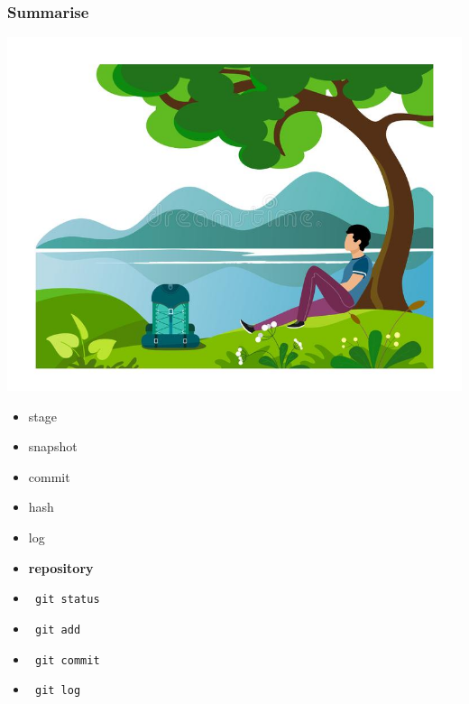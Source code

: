 \documentclass[aspectratio=169]{beamer}
\begin{document}
\begin{frame}
\frametitle<presentation>{Summarise}
  
\noindent\begin{minipage}{0.6\textwidth}%
\includegraphics[width=\linewidth]{pictures/resting-under-tree.jpg}
\end{minipage}%
\hfill%
\begin{minipage}{0.4\textwidth}\raggedleft
\begin{itemize}
    \item stage
    \item snapshot
	\item commit
	\item hash
	\item  log
	\item \textbf{repository}
	\end{itemize}
	\pause
	\begin{itemize}
    \item  \texttt{ git status}
    \item  \texttt{ git add}
    \item  \texttt{ git commit} 
    \item  \texttt{ git log}
	\end{itemize}
	
\end{minipage}
  
\end{frame}
\end{document}
